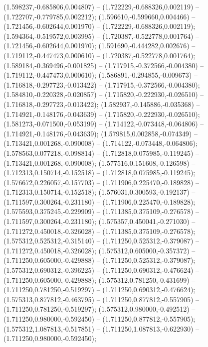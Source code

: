  (1.598237,-0.685806,0.004807) -- (1.722229,-0.688326,0.002119) -- (1.722707,-0.779785,0.002212);
 (1.596610,-0.599660,0.004466) -- (1.721456,-0.602644,0.001970) -- (1.722229,-0.688326,0.002119);
 (1.594364,-0.519572,0.003995) -- (1.720387,-0.522778,0.001764) -- (1.721456,-0.602644,0.001970);
 (1.591690,-0.444282,0.002676) -- (1.719112,-0.447473,0.000610) -- (1.720387,-0.522778,0.001764);
 (1.589184,-0.369496,-0.001825) -- (1.717915,-0.372566,-0.004380) -- (1.719112,-0.447473,0.000610);
 (1.586891,-0.294855,-0.009673) -- (1.716818,-0.297723,-0.013422) -- (1.717915,-0.372566,-0.004380);
 (1.584810,-0.220328,-0.020857) -- (1.715820,-0.222930,-0.026510) -- (1.716818,-0.297723,-0.013422);
 (1.582937,-0.145886,-0.035368) -- (1.714921,-0.148176,-0.043639) -- (1.715820,-0.222930,-0.026510);
 (1.581273,-0.071500,-0.053199) -- (1.714122,-0.073448,-0.064806) -- (1.714921,-0.148176,-0.043639);
 (1.579815,0.002858,-0.074349) -- (1.713421,0.001268,-0.090008) -- (1.714122,-0.073448,-0.064806);
 (1.578563,0.077218,-0.098814) -- (1.712818,0.075985,-0.119245) -- (1.713421,0.001268,-0.090008);
 (1.577516,0.151608,-0.126598) -- (1.712313,0.150714,-0.152518) -- (1.712818,0.075985,-0.119245);
 (1.576672,0.226057,-0.157703) -- (1.711906,0.225470,-0.189828) -- (1.712313,0.150714,-0.152518);
 (1.576031,0.300593,-0.192137) -- (1.711597,0.300264,-0.231180) -- (1.711906,0.225470,-0.189828);
 (1.575593,0.375245,-0.229909) -- (1.711385,0.375109,-0.276578) -- (1.711597,0.300264,-0.231180);
 (1.575357,0.450041,-0.271030) -- (1.711272,0.450018,-0.326028) -- (1.711385,0.375109,-0.276578);
 (1.575312,0.525312,-0.315140) -- (1.711250,0.525312,-0.379087) -- (1.711272,0.450018,-0.326028);
 (1.575312,0.605000,-0.357372) -- (1.711250,0.605000,-0.429888) -- (1.711250,0.525312,-0.379087);
 (1.575312,0.690312,-0.396225) -- (1.711250,0.690312,-0.476624) -- (1.711250,0.605000,-0.429888);
 (1.575312,0.781250,-0.431699) -- (1.711250,0.781250,-0.519297) -- (1.711250,0.690312,-0.476624);
 (1.575313,0.877812,-0.463795) -- (1.711250,0.877812,-0.557905) -- (1.711250,0.781250,-0.519297);
 (1.575312,0.980000,-0.492512) -- (1.711250,0.980000,-0.592450) -- (1.711250,0.877812,-0.557905);
 (1.575312,1.087813,-0.517851) -- (1.711250,1.087813,-0.622930) -- (1.711250,0.980000,-0.592450);
